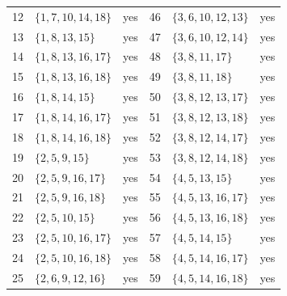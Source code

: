 \documentclass[aps,pra,reprint,superscriptaddress,longbibliography,nofootinbib,floatfix,10pt]{revtex4-2}
\theoremstyle{definition}
\begin{document}
\begin{longtable}{rlc@{\qquad}rlc}
12 & $\{1,\allowbreak 7,\allowbreak 10,\allowbreak 14,\allowbreak 18\}$ & yes & 46 & $\{3,\allowbreak 6,\allowbreak 10,\allowbreak 12,\allowbreak 13\}$ & yes\\
13 & $\{1,\allowbreak 8,\allowbreak 13,\allowbreak 15\}$ & yes & 47 & $\{3,\allowbreak 6,\allowbreak 10,\allowbreak 12,\allowbreak 14\}$ & yes\\
14 & $\{1,\allowbreak 8,\allowbreak 13,\allowbreak 16,\allowbreak 17\}$ & yes & 48 & $\{3,\allowbreak 8,\allowbreak 11,\allowbreak 17\}$ & yes\\
15 & $\{1,\allowbreak 8,\allowbreak 13,\allowbreak 16,\allowbreak 18\}$ & yes & 49 & $\{3,\allowbreak 8,\allowbreak 11,\allowbreak 18\}$ & yes\\
16 & $\{1,\allowbreak 8,\allowbreak 14,\allowbreak 15\}$ & yes & 50 & $\{3,\allowbreak 8,\allowbreak 12,\allowbreak 13,\allowbreak 17\}$ & yes\\
17 & $\{1,\allowbreak 8,\allowbreak 14,\allowbreak 16,\allowbreak 17\}$ & yes & 51 & $\{3,\allowbreak 8,\allowbreak 12,\allowbreak 13,\allowbreak 18\}$ & yes\\
18 & $\{1,\allowbreak 8,\allowbreak 14,\allowbreak 16,\allowbreak 18\}$ & yes & 52 & $\{3,\allowbreak 8,\allowbreak 12,\allowbreak 14,\allowbreak 17\}$ & yes\\
19 & $\{2,\allowbreak 5,\allowbreak 9,\allowbreak 15\}$ & yes & 53 & $\{3,\allowbreak 8,\allowbreak 12,\allowbreak 14,\allowbreak 18\}$ & yes\\
20 & $\{2,\allowbreak 5,\allowbreak 9,\allowbreak 16,\allowbreak 17\}$ & yes & 54 & $\{4,\allowbreak 5,\allowbreak 13,\allowbreak 15\}$ & yes\\
21 & $\{2,\allowbreak 5,\allowbreak 9,\allowbreak 16,\allowbreak 18\}$ & yes & 55 & $\{4,\allowbreak 5,\allowbreak 13,\allowbreak 16,\allowbreak 17\}$ & yes\\
22 & $\{2,\allowbreak 5,\allowbreak 10,\allowbreak 15\}$ & yes & 56 & $\{4,\allowbreak 5,\allowbreak 13,\allowbreak 16,\allowbreak 18\}$ & yes\\
23 & $\{2,\allowbreak 5,\allowbreak 10,\allowbreak 16,\allowbreak 17\}$ & yes & 57 & $\{4,\allowbreak 5,\allowbreak 14,\allowbreak 15\}$ & yes\\
24 & $\{2,\allowbreak 5,\allowbreak 10,\allowbreak 16,\allowbreak 18\}$ & yes & 58 & $\{4,\allowbreak 5,\allowbreak 14,\allowbreak 16,\allowbreak 17\}$ & yes\\
25 & $\{2,\allowbreak 6,\allowbreak 9,\allowbreak 12,\allowbreak 16\}$ & yes & 59 & $\{4,\allowbreak 5,\allowbreak 14,\allowbreak 16,\allowbreak 18\}$ & yes\\

\end{longtable}
\end{document}
